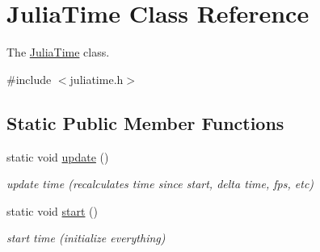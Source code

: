 \hypertarget{classJuliaTime}{}\section{Julia\+Time Class Reference}
\label{classJuliaTime}


The \hyperlink{classJuliaTime}{Julia\+Time} class.  




{\ttfamily \#include $<$juliatime.\+h$>$}

\subsection*{Static Public Member Functions}
\begin{DoxyCompactItemize}
\item 
\mbox{\label{classJuliaTime_a0de18abd49917adc503f1065aa1e47b4}} 
static void \hyperlink{classJuliaTime_a0de18abd49917adc503f1065aa1e47b4}{update} ()
\begin{DoxyCompactList}\small\item\em update time (recalculates time since start, delta time, fps, etc) \end{DoxyCompactList}\item 
\mbox{\label{classJuliaTime_ae466da8414d593da71a955e0bcd2b816}} 
static void \hyperlink{classJuliaTime_ae466da8414d593da71a955e0bcd2b816}{start} ()
\begin{DoxyCompactList}\small\item\em start time (initialize everything) \end{DoxyCompactList}\end{DoxyCompactItemize}
